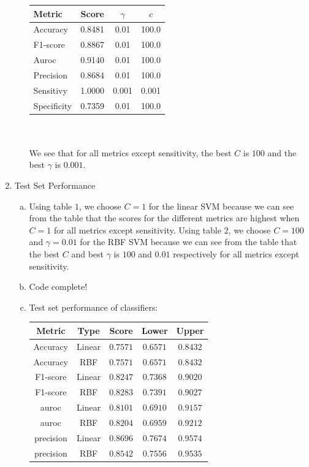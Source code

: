 \documentclass[11pt]{article}
\begin{document}
\begin{enumerate}
\begin{enumerate}[(a)]
\begin{tabular}{| l | c | c | c |}
\hline
Metric & Score & $\gamma$ & $c$ \\
\hline
Accuracy & 0.8481 & 0.01 & 100.0 \\
F1-score & 0.8867 & 0.01 & 100.0 \\
Auroc & 0.9140 & 0.01 & 100.0 \\
Precision & 0.8684 & 0.01 & 100.0 \\
Sensitivy & 1.0000 & 0.001 & 0.001 \\
Specificity & 0.7359 & 0.01 & 100.0 \\
\hline
\end{tabular} \\ \\
We see that for all metrics except sensitivity, the best $C$ is $100$ and the best $\gamma$ is $0.001$. 
\end{enumerate}
\item Test Set Performance
\begin{enumerate}[(a)]
\item Using table $1$, we choose $C=1$ for the linear SVM because we can see from the table that the scores for the different metrics are highest when $C=1$ for all metrics except sensitivity. Using table $2$, we choose $C=100$ and $\gamma = 0.01$ for the RBF SVM because we can see from the table that  the best $C$ and best $\gamma$ is $100$ and $0.01$ respectively for all metrics except sensitivity. 
\item Code complete!
\item Test set performance of classifiers: \\
\begin{tabular}{| c | c | c | c | c |}
\hline
Metric & Type &Score & Lower & Upper \\
\hline
Accuracy & Linear & $0.7571$ & $0.6571$ & $0.8432$ \\
Accuracy & RBF & $0.7571$ & $0.6571$ & $0.8432$ \\
F1-score & Linear & $0.8247$ & $0.7368$ & $0.9020$ \\
F1-score & RBF & $0.8283$ & $0.7391$ & $0.9027$ \\
auroc & Linear & $0.8101$ & $0.6910$ & $0.9157$ \\
auroc & RBF & $0.8204$ & $0.6959$ & $0.9212$ \\
precision & Linear & $0.8696$ & $0.7674$ & $0.9574$ \\
precision & RBF & $0.8542$ & $0.7556$ & $0.9535$ \\

\end{tabular}
\end{enumerate}
\end{enumerate}
\end{document}
